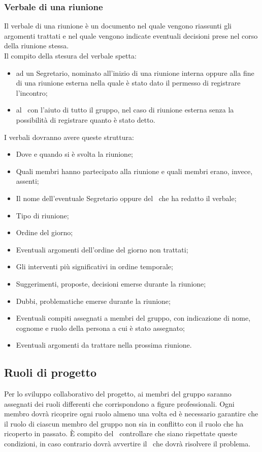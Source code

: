 \documentclass[../NormeProgetto.tex]{subfiles}
\begin{document}
		\subsubsection{Verbale di una riunione}
			Il verbale di una riunione è un documento nel quale vengono riassunti gli argomenti trattati e nel quale vengono indicate eventuali decisioni prese nel corso della riunione stessa.\\ Il compito della stesura del verbale spetta:
			\begin{itemize}
				\item ad un Segretario, nominato all'inizio di una riunione interna oppure alla fine di una riunione esterna nella quale è stato dato il permesso di registrare l'incontro;
				\item al \responsabilediprogetto\ con l'aiuto di tutto il gruppo, nel caso di riunione esterna senza la possibilità di registrare quanto è stato detto.
			\end{itemize}
			I verbali dovranno avere queste struttura:
			\begin{itemize}
				\item Dove e quando si è svolta la riunione;
				\item Quali membri hanno partecipato alla riunione e quali membri erano, invece, assenti;
				\item Il nome dell'eventuale Segretario oppure del \responsabilediprogetto\ che ha redatto il verbale;
				\item Tipo di riunione;
				\item Ordine del giorno;
				\item Eventuali argomenti dell'ordine del giorno non trattati;
				\item Gli interventi più significativi in ordine temporale;
				\item Suggerimenti, proposte, decisioni emerse durante la riunione;
				\item Dubbi, problematiche emerse durante la riunione;
				\item Eventuali compiti assegnati a membri del gruppo, con indicazione di nome, cognome e ruolo della persona a cui è stato assegnato;
				\item Eventuali argomenti da trattare nella prossima riunione.
			\end{itemize}
	\subsection{Ruoli di progetto}
		Per lo sviluppo collaborativo del progetto, ai membri del gruppo saranno assegnati dei ruoli differenti che corrispondono a figure professionali. Ogni membro dovrà ricoprire ogni ruolo almeno una volta ed è necessario garantire che il ruolo di ciascun membro del gruppo non sia in conflitto con il ruolo che ha ricoperto in passato. È compito del \verificatore\ controllare che siano rispettate queste condizioni, in caso contrario dovrà avvertire il \responsabilediprogetto\ che dovrà risolvere il problema.
\end{document}
